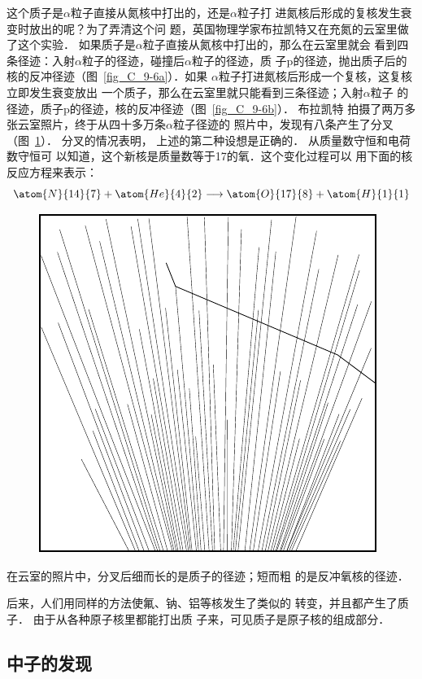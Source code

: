 这个质子是$\alpha$粒子直接从氮核中打出的，还是$\alpha$粒子打
进氮核后形成的复核发生衰变时放出的呢？为了弄清这个问
题，英国物理学家布拉凯特又在充氮的云室里做了这个实验．
如果质子是$\alpha$粒子直接从氮核中打出的，那么在云室里就会
看到四条径迹：入射$\alpha$粒子的径迹，碰撞后$\alpha$粒子的径迹，质
子p的径迹，抛出质子后的核的反冲径迹（图~\ref{fig_C_9-6a}）．如果
$\alpha$粒子打进氮核后形成一个复核，这复核立即发生衰变放出
一个质子，那么在云室里就只能看到三条径迹；入射$\alpha$粒子
的径迹，质子p的径迹，核的反冲径迹（图~\ref{fig_C_9-6b}）．
布拉凯特
拍摄了两万多张云室照片，终于从四十多万条$\alpha$粒子径迹的
照片中，发现有八条产生了分叉（图~\ref{fig_C_9-7}）．
分叉的情况表明，
上述的第二种设想是正确的．
从质量数守恒和电荷数守恒可
以知道，这个新核是质量数等于17的氧．这个变化过程可以
用下面的核反应方程来表示：
\[\atom{N}{14}{7}+\atom{He}{4}{2}\longrightarrow \atom{O}{17}{8}+\atom{H}{1}{1} \]
\begin{figure}[htbp]
    \centering
    \includegraphics{fig/C/9-7.pdf}
    \caption{}\label{fig_C_9-7}
\end{figure}

在云室的照片中，分叉后细而长的是质子的径迹；短而粗
的是反冲氧核的径迹．

后来，人们用同样的方法使氟、钠、铝等核发生了类似的
转变，并且都产生了质子．
由于从各种原子核里都能打出质
子来，可见质子是原子核的组成部分．

\subsection{中子的发现}

